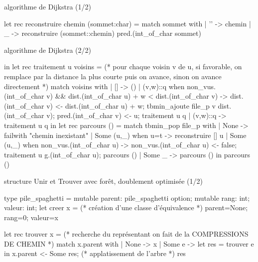 \begin{adjustwidth}{-3cm}{-3cm}
\begin{implementation}{algorithme de Dijkstra (1/2)}
\begin{lstOCaml}
        let rec reconstruire chemin (sommet:char) =
            match sommet with
            | '' -> chemin
            | _ -> reconstruire (sommet::chemin) pred.(int_of_char sommet)
    \end{lstOCaml}
\end{implementation}

\begin{implementation}{algorithme de Dijkstra (2/2)}
    \begin{lstOCaml}
        in let rec traitement u voisins =
         (* pour chaque voisin v de u, si favorable, 
            on remplace par la distance la plus courte puis on avance, 
            sinon on avance directement *)
            match voisins with
            | [] -> ()
            | (v,w)::q  when non_vus.(int_of_char v) && 
              dist.(int_of_char u) + w < dist.(int_of_char v) ->
                dist.(int_of_char v) <- dist.(int_of_char u) + w;
                tbmin_ajoute file_p v dist.(int_of_char v);
                pred.(int_of_char v) <- u;
                traitement u q
            | (v,w)::q -> traitement u q
        in let rec parcours () = 
            match tbmin_pop file_p with
            | None -> failwith "chemin inexistant"
            | Some (u,_) when u=t -> reconstruire [] u
            | Some (u,_) when non_vus.(int_of_char u) ->
                non_vus.(int_of_char u) <- false;
                traitement u g.(int_of_char u);
                parcours ()
            | Some _ -> parcours ()
        in parcours ()
    \end{lstOCaml}
\end{implementation}

\begin{implementation}{structure Unir et Trouver avec forêt, doublement optimisée (1/2)}
    \begin{lstOCaml}
    type pile_spaghetti = { 
        mutable parent: pile_spaghetti option; 
        mutable rang: int;
        valeur: int;
    }
    let creer x =
     (* création d'une classe d'équivalence *)
        {parent=None; rang=0; valeur=x}
    
    let rec trouver x =
     (* recherche du représentant
        on fait de la COMPRESSIONS DE CHEMIN *)
        match x.parent with
        | None -> x
        | Some e -> 
            let res = trouver e in
            x.parent <- Some res; (* applatissement de l'arbre *)
            res
    \end{lstOCaml}
\end{implementation}


\end{adjustwidth}
